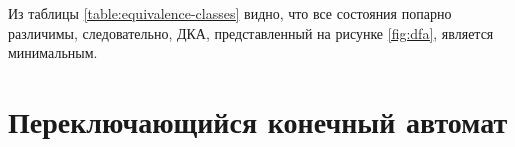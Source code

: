 \documentclass[a4paper, 12pt]{article}
\begin{document}
    Из таблицы \ref{table:equivalence-classes} видно, что все состояния попарно различимы, следовательно, ДКА, представленный на рисунке \ref{fig:dfa}, является минимальным.

    \section{Переключающийся конечный автомат}

\end{document}
